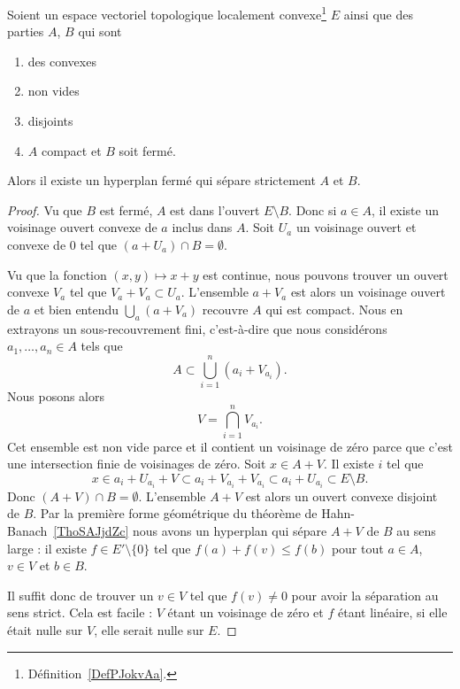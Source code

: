 \begin{theorem} \label{ThoACuKgtW}
	Soient un espace vectoriel topologique localement convexe\footnote{Définition~\ref{DefPJokvAa}.} \( E\) ainsi que des parties \( A\), \( B\) qui sont
	\begin{enumerate}
		\item
		      des convexes
		\item
		      non vides
		\item
		      disjoints
		\item
		      \( A\) compact et \( B\) soit fermé.
	\end{enumerate}
	Alors il existe un hyperplan fermé qui sépare strictement \( A\) et \( B\).
\end{theorem}

\begin{proof}
	Vu que \( B\) est fermé, \( A\) est dans l'ouvert \( E\setminus B\). Donc si \( a\in A\), il existe un voisinage ouvert convexe de \( a\) inclus dans \( A\). Soit \( U_a\) un voisinage ouvert et convexe de \( 0\) tel que \( (a+U_a)\cap B=\emptyset\).

	Vu que la fonction \( (x,y)\mapsto x+y\) est continue, nous pouvons trouver un ouvert convexe \( V_a\) tel que \( V_a+V_a\subset U_a\). L'ensemble \( a+V_a\) est alors un voisinage ouvert de \( a\) et bien entendu \( \bigcup_a(a+V_a)\) recouvre \( A\) qui est compact. Nous en extrayons un sous-recouvrement fini, c'est-à-dire que nous considérons \( a_1,\ldots, a_n\in A\) tels que
	\begin{equation}
		A\subset \bigcup_{i=1}^n(a_i+V_{a_i}).
	\end{equation}
	Nous posons alors
	\begin{equation}
		V=\bigcap_{i=1}^nV_{a_i}.
	\end{equation}
	Cet ensemble est non vide parce et il contient un voisinage de zéro parce que c'est une intersection finie de voisinages de zéro. Soit \( x\in A+V\). Il existe \( i\) tel que
	\begin{equation}
		x\in a_i+U_{a_i}+V\subset a_i+V_{a_i}+V_{a_i}\subset a_i+U_{a_i}\subset E\setminus B.
	\end{equation}
	Donc \( (A+V)\cap B=\emptyset\). L'ensemble \( A+V\) est alors un ouvert convexe disjoint de \( B\). Par la première forme géométrique du théorème de Hahn-Banach~\ref{ThoSAJjdZc} nous avons un hyperplan qui sépare \( A+V\) de \( B\) au sens large : il existe \( f\in E'\setminus\{ 0 \}\) tel que \( f(a)+f(v)\leq f(b)\) pour tout \( a\in A\), \( v\in V\) et \( b\in B\).

	Il suffit donc de trouver un \( v\in V\) tel que \( f(v)\neq 0\) pour avoir la séparation au sens strict. Cela est facile : \( V\) étant un voisinage de zéro et \( f\) étant linéaire, si elle était nulle sur \( V\), elle serait nulle sur \( E\).
\end{proof}


